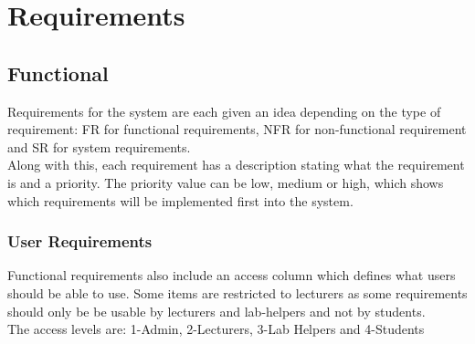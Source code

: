 \documentclass[12pt]{article}  %
\begin{document}


\newpage
\section{Requirements}
 


\subsection{Functional}
Requirements for the system are each given an idea depending on the type of requirement: FR for functional requirements, NFR for non-functional requirement and SR for system requirements.\\
Along with this, each requirement has a description stating what the requirement is and a priority. The priority value can be low, medium or high, which shows which requirements will be implemented first into the system.


\def\arraystretch{1.5}
\subsubsection{User Requirements}
Functional requirements also include an access column which defines what users should be able to use. Some items are restricted to lecturers as some requirements should only be be usable by lecturers and lab-helpers and not by students.\\
The access levels are: 1-Admin, 2-Lecturers, 3-Lab Helpers and 4-Students
\end{document}

